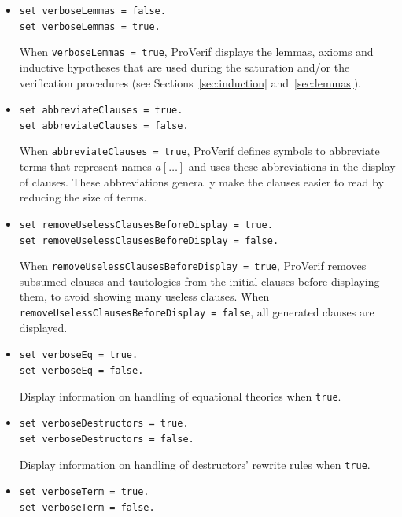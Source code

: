 \documentclass{book}
\begin{document}
\begin{itemize}
When \lstinline{verboseClauses = none}, ProVerif does not display
the clauses it generates.
When \lstinline{verboseClauses = short}, it displays them.
When \lstinline{verboseClauses = explained}, it adds an
English sentence after each clause it generates to explain where this
clause comes from.

\item \lstinline{set verboseLemmas = false.}\\
\lstinline{set verboseLemmas = true.}

When \lstinline{verboseLemmas = true}, ProVerif displays the lemmas, axioms and inductive hypotheses
that are used during the saturation and/or the verification procedures (see Sections~\ref{sec:induction} and~\ref{sec:lemmas}).

\item \lstinline{set abbreviateClauses = true.}\\
\lstinline{set abbreviateClauses = false.}

When \lstinline{abbreviateClauses = true}, ProVerif defines symbols to
abbreviate terms that represent names $a[\ldots]$ and uses these
abbreviations in the display of clauses. These
abbreviations generally make the clauses easier to read by reducing
the size of terms.

\item \lstinline{set removeUselessClausesBeforeDisplay = true.}\\
\lstinline{set removeUselessClausesBeforeDisplay = false.}

When \lstinline{removeUselessClausesBeforeDisplay = true}, ProVerif removes
subsumed clauses and tautologies from the initial clauses before
displaying them, to avoid showing many useless clauses.
When \lstinline{removeUselessClausesBeforeDisplay = false}, all generated
clauses are displayed.

\item \lstinline{set verboseEq = true.}\\
\lstinline{set verboseEq = false.}

Display information on handling of equational theories when \lstinline{true}.

\item \lstinline{set verboseDestructors = true.}\\
\lstinline{set verboseDestructors = false.}

Display information on handling of destructors' rewrite rules when \lstinline{true}.

\item \lstinline{set verboseTerm = true.}\\
\lstinline{set verboseTerm = false.}


\end{itemize}
\end{document}
